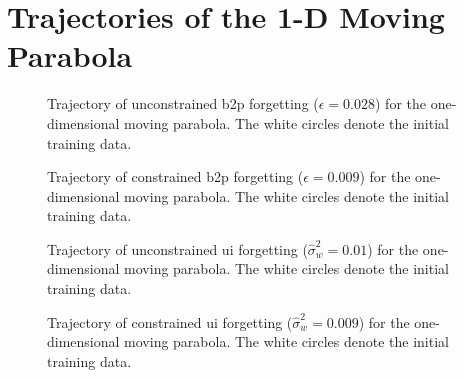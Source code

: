 \newpage
\section{Trajectories of the 1-D Moving Parabola}
\label{apx:trajectories_1D_parabola}

\begin{figure}[h]
    \centering
    
    \caption[Trajectory of unconstrained \gls{b2p} forgetting for the one-dimensional moving parabola.]{Trajectory of unconstrained \gls{b2p} forgetting ($\epsilon=0.028$) for the one-dimensional moving parabola. The white circles denote the initial training data.}
    \label{fig:Parabola1D_B2P_unconstrained}
\end{figure}
\begin{figure}[b]
    \centering
    \vspace{-5cm}
    
    \caption[Trajectory of constrained \gls{b2p} forgetting for the one-dimensional moving parabola.]{Trajectory of constrained \gls{b2p} forgetting ($\epsilon=0.009$) for the one-dimensional moving parabola. The white circles denote the initial training data.}
    \label{fig:Parabola1D_B2P_constrained}
\end{figure}

\begin{figure}[h]
    \centering
    
    \caption[Trajectory of unconstrained \gls{ui} forgetting for the one-dimensional moving parabola.]{Trajectory of unconstrained \gls{ui} forgetting ($\hat{\sigma}_w^2=0.01$) for the one-dimensional moving parabola. The white circles denote the initial training data.}
    \label{fig:Parabola1D_UI_unconstrained}
\end{figure}
\begin{figure}[h]
    \centering
    
    \caption[Trajectory of constrained \gls{ui} forgetting for the one-dimensional moving parabola.]{Trajectory of constrained \gls{ui} forgetting ($\hat{\sigma}_w^2=0.009$) for the one-dimensional moving parabola. The white circles denote the initial training data.}
    \label{fig:Parabola1D_UI_constrained}
\end{figure}